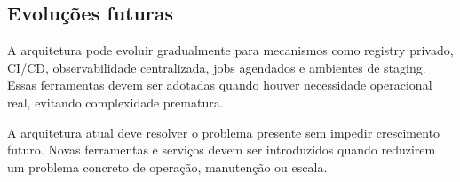 \subsection{Evoluções futuras}

A arquitetura pode evoluir gradualmente para mecanismos como registry privado, CI/CD, observabilidade centralizada, jobs agendados e ambientes de staging. Essas ferramentas devem ser adotadas quando houver necessidade operacional real, evitando complexidade prematura.

\begin{explicacao}
A arquitetura atual deve resolver o problema presente sem impedir crescimento futuro. Novas ferramentas e serviços devem ser introduzidos quando reduzirem um problema concreto de operação, manutenção ou escala.
\end{explicacao}
